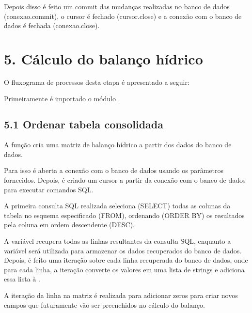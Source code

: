 \documentclass[a4paper,10pt,brazil]{sphinxmanual}
\begin{document}
\sphinxAtStartPar
Depois disso é feito um commit das mudanças realizadas no banco de dados (conexao.commit), o cursor é fechado (cursor.close) e a conexão com o banco de dados é fechada (conexao.close).

\sphinxstepscope


\section{5. Cálculo do balanço hídrico}
\label{\detokenize{5calculoBalanco:calculo-do-balanco-hidrico}}\label{\detokenize{5calculoBalanco::doc}}
\sphinxAtStartPar
O fluxograma de processos desta etapa é apresentado a seguir:


\sphinxAtStartPar
Primeiramente é importado o módulo .


\subsection{5.1 Ordenar tabela consolidada}
\label{\detokenize{5calculoBalanco:ordenar-tabela-consolidada}}
\sphinxAtStartPar
A função  cria uma matriz de balanço hídrico a partir dos dados do banco de dados.

\sphinxAtStartPar
Para isso é aberta a conexão com o banco de dados usando os parâmetros fornecidos. Depois, é criado um cursor a partir da conexão com o banco de dados para executar comandos SQL.

\sphinxAtStartPar
A primeira consulta SQL realizada seleciona (SELECT) todas as colunas da tabela  no esquema especificado  (FROM), ordenando (ORDER BY) os resultados pela coluna  em ordem descendente (DESC).

\sphinxAtStartPar
A variável  recupera todas as linhas resultantes da consulta SQL, enquanto a variável  será utilizada para armazenar os dados recuperados do banco de dados. Depois, é feito uma iteração sobre cada linha recuperada do banco de dados, onde para cada linha, a iteração converte os valores em uma lista de strings e adiciona essa lista à .

\sphinxAtStartPar
A iteração da linha na matriz é realizada para adicionar zeros para criar novos campos que futuramente vão ser preenchidos no cálculo do balanço.
\end{document}
